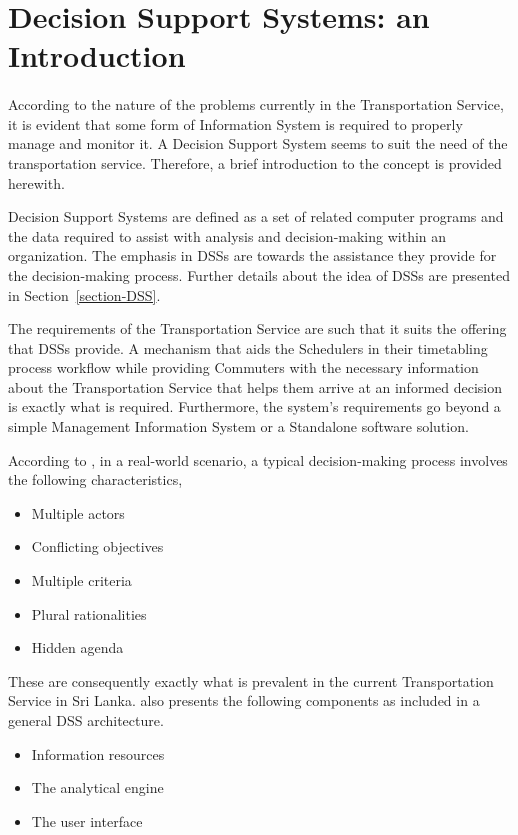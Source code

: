 \section{Decision Support Systems: an Introduction}
\label{section-DSSIntro}

\paragraph{} According to the nature of the problems currently in the Transportation Service, it is evident that some form of Information System is required to properly manage and monitor it. A Decision Support System seems to suit the need of the transportation service. Therefore, a brief introduction to the concept is provided herewith.

Decision Support Systems are defined as a set of related computer programs and the data required to assist with analysis and decision-making within an organization. The emphasis in DSSs are towards the assistance they provide for the decision-making process. Further details about the idea of DSSs are presented in Section~\ref{section-DSS}.

The requirements of the Transportation Service are such that it suits the offering that DSSs provide. A mechanism that aids the Schedulers in their timetabling process workflow while providing Commuters with the necessary information about the Transportation Service that helps them arrive at an informed decision is exactly what is required. Furthermore, the system's requirements go beyond a simple Management Information System or a Standalone software solution. 

According to \cite{Fedra2000}, in a real-world scenario, a typical decision-making process involves the following characteristics,

\begin {itemize}
\item Multiple actors
\item Conflicting objectives
\item Multiple criteria
\item Plural rationalities
\item Hidden agenda
\end {itemize}

These are consequently exactly what is prevalent in the current Transportation Service in Sri Lanka. \cite{Fedra2000} also presents the following components as included in a general DSS architecture.

\begin {itemize}
\item Information resources
\item The analytical engine
\item The user interface
\end {itemize}

